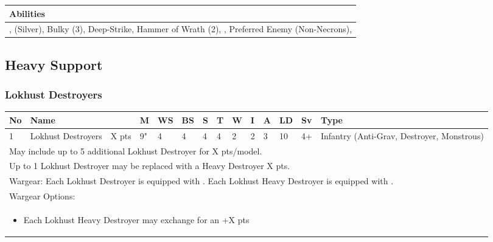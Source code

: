 \noindent
\begin{tabular}{||m{532pt}||}
	\hline
	Abilities \\
	\hline
	\quickref{Annihilation Protocols}, \quickref{Awakening Protocols} (Silver), Bulky (3), Deep-Strike, Hammer of Wrath (2), \quickref{Living Metal}, Preferred Enemy (Non-Necrons), \quickref{Reanimation Protocols} \\
	\hline
\end{tabular}



\newpage
\subsection{Heavy Support}

\subsubsection{Lokhust Destroyers}
 
\noindent
\begin{tabular}{||m{10pt} m{95pt} m{30pt} m{11pt} m{11pt} m{11pt} m{11pt} m{11pt} m{11pt} m{11pt} m{11pt} m{11pt} m{11pt} m{125pt}||}
	\hline
	No & Name & & M & WS & BS & S & T & W & I & A & LD & Sv & Type \\
	\hline
	1 & Lokhust Destroyers & X pts & 9" & 4 & 4 & 4 & 4 & 2 & 2 & 3 & 10 & 4+ & Infantry (Anti-Grav, Destroyer, Monstrous) \\
	\hline
	\hline
	\multicolumn{14}{||Z{532 pt}||}{May include up to 5 additional Lokhust Destroyer for X pts/model.} \\	
	\multicolumn{14}{||Z{532 pt}||}{Up to 1 Lokhust Destroyer may be replaced with a Heavy Destroyer X pts.} \\	
	\hline
	\hline
	\multicolumn{14}{||Z{532 pt}||}{Wargear: Each Lokhust Destroyer is equipped with \quickref{Gauss Cannon}. Each Lokhust Heavy Destroyer is equipped with \quickref{Gauss Destructor}.} \\
	\multicolumn{14}{||Z{532 pt}||}{Wargear Options:} \\	\multicolumn{14}{||Z{532 pt}||}{\begin{itemize}
			\item Each Lokhust Heavy Destroyer may exchange \quickref{Gauss Destructor} for an \quickref{Enmitic Exterminator} \hrulefill +X pts
	\end{itemize}} \\
	\hline
\end{tabular}

